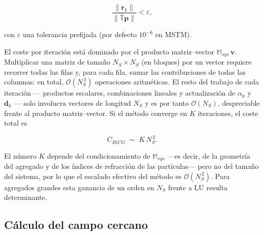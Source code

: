 \begin{equation}
  \frac{\|\mathbf{r}_k\|}{\|\bar{\mathbb{T}}\mathbf{p}\|} < \varepsilon,
\end{equation}

con $\varepsilon$ una tolerancia prefijada (por defecto $10^{-6}$ en
MSTM).

El coste por iteración está dominado por el producto matriz--vector
$\mathbb{M}_{sys}\,\mathbf{v}$. Multiplicar una matriz de tamaño
$N_S \times N_S$ (en bloques) por un vector requiere recorrer todas las
filas y, para cada fila, sumar las contribuciones de todas las
columnas: en total, $\mathcal{O}(N_S^{\,2})$ operaciones aritméticas.
El resto del trabajo de cada iteración --- productos escalares,
combinaciones lineales y actualización de $\alpha_k$ y $\mathbf{d}_k$
--- solo involucra vectores de longitud $N_S$ y es por tanto
$\mathcal{O}(N_S)$, despreciable frente al producto matriz--vector. Si
el método converge en $K$ iteraciones, el coste total es

\begin{equation}
  C_{BiCG} \;\sim\; K\,N_S^{\,2}.
\end{equation}

El número $K$ depende del condicionamiento de $\mathbb{M}_{sys}$ ---es
decir, de la geometría del agregado y de los índices de refracción de
las partículas--- pero no del tamaño del sistema, por lo que el
escalado efectivo del método es $\mathcal{O}(N_S^{\,2})$. Para agregados
grandes esta ganancia de un orden en $N_S$ frente a LU resulta
determinante.



\subsection{Cálculo del campo cercano}
\label{sec:nearfield}

